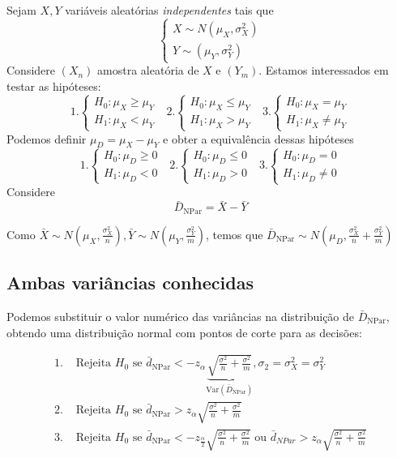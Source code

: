 \documentclass[
  letterpaper,
  DIV=11,
  numbers=noendperiod]{scrreprt}
\begin{document}
Sejam \(X, Y\) variáveis aleatórias \emph{independentes} tais que
\[ \begin{cases}
X\sim N(\mu_{X},\sigma^2_{X}) \\
Y\sim (\mu_{Y},\sigma^2_{Y})
\end{cases} \] Considere \((X_{n})\) amostra aleatória de \(X\) e
\((Y_{m})\). Estamos interessados em testar as hipóteses: \[
1.
\begin{cases}
H_{0}:\mu_{X}\geq \mu_{Y} \\
H_{1}: \mu_{X} < \mu_{Y}
\end{cases} ~~~2.
\begin{cases}
H_{0}:\mu_{X}\leq \mu_{Y} \\
H_{1}: \mu_{X} > \mu_{Y}
\end{cases} ~~~3.
\begin{cases}
H_{0}:\mu_{X}= \mu_{Y} \\
H_{1}: \mu_{X} \neq \mu_{Y}
\end{cases}
\] Podemos definir \(\mu_{D}=\mu_{X}-\mu_{Y}\) e obter a equivalência
dessas hipóteses \[
1.
\begin{cases}
H_{0}:\mu_{D} \geq 0 \\
H_{1}: \mu_{D} < 0
\end{cases} ~~~2.
\begin{cases}
H_{0}:\mu_{D} \leq 0 \\
H_{1}: \mu_{D} > 0
\end{cases} ~~~3.
\begin{cases}
H_{0}:\mu_{D} = 0 \\
H_{1}: \mu_{D} \neq 0
\end{cases}
\] Considere \[
\bar{D}_{\mathrm{NPar}}=\bar{X}-\bar{Y}
\]

Como
\(\bar{X}\sim N\left( \mu_{X}, \frac{\sigma^2_{X}}{n} \right), \bar{Y} \sim N\left( \mu_{Y}, \frac{\sigma^2_{Y}}{m} \right)\),
temos que
\(\bar{D}_{\mathrm{NPar}} \sim N\left( \mu_{D}, \frac{\sigma^2_{X}}{n} + \frac{\sigma^2_{Y}}{m} \right)\)

\subsection{Ambas variâncias
conhecidas}\label{ambas-variuxe2ncias-conhecidas}

Podemos substituir o valor numérico das variâncias na distribuição de
\(\bar{D}_{\mathrm{NPar}}\), obtendo uma distribuição normal com pontos
de corte para as decisões:

\[
\begin{aligned}
1. &\text{ Rejeita $H_{0}$ se } \bar{d}_{\mathrm{NPar}} < -z_{\alpha} \underbrace{\sqrt{ \frac{\sigma^2}{n} +
\frac{\sigma^2}{m} }}_{\mathrm{Var}(\bar{D}_{\mathrm{NPar}})}, \sigma_{2}=\sigma^2_{X}=\sigma^2_{Y} \\
2. & \text{ Rejeita $H_{0}$ se } \bar{d}_{\mathrm{NPar}} > z_{\alpha} \sqrt{ \frac{\sigma^2}{n} + \frac{\sigma^2}{m} } \\
3. & \text{ Rejeita $H_{0}$ se } \bar{d}_{\mathrm{NPar}} < -z_{\frac{\alpha}{2}} \sqrt{ \frac{\sigma^2}{n} +
\frac{\sigma^2}{m} } \text{ ou } \bar{d}_{NPar} > z_{\alpha} \sqrt{ \frac{\sigma^2}{n} + \frac{\sigma^2}{m} }
\end{aligned}
\]
\end{document}
